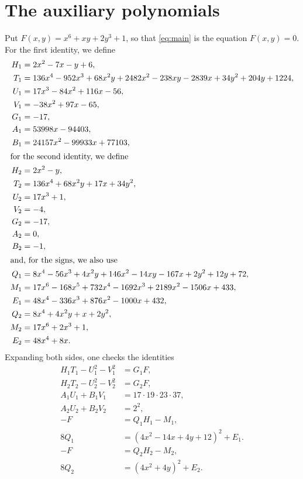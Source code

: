 \documentclass[11pt]{article}
\begin{document}
\section{The auxiliary polynomials}

Put $F(x,y)=x^{6}+xy+2y^{3}+1$, so that \eqref{eq:main} is the equation $F(x,y)=0$.
For the first identity, we define
\begin{align*}
H_{1}&=2x^{2}-7x-y+6,\\
T_{1}&=136x^{4}-952x^{3}+68x^{2}y+2482x^{2}-238xy-2839x+34y^{2}+204y+1224,\\
U_{1}&=17x^{3}-84x^{2}+116x-56,\\
V_{1}&=-38x^{2}+97x-65,\\
G_{1}&=-17,\\
A_{1}&=53998x-94403,\\
B_{1}&=24157x^{2}-99933x+77103,\\
\intertext{for the second identity, we define}
H_{2}&=2x^{2}-y,\\
T_{2}&=136x^{4}+68x^{2}y+17x+34y^{2},\\
U_{2}&=17x^{3}+1,\\
V_{2}&=-4,\\
G_{2}&=-17,\\
A_{2}&=0,\\
B_{2}&=-1,\\
\intertext{and, for the signs, we also use}
Q_{1}&=8x^{4}-56x^{3}+4x^{2}y+146x^{2}-14xy-167x+2y^{2}+12y+72,\\
M_{1}&=17x^{6}-168x^{5}+732x^{4}-1692x^{3}+2189x^{2}-1506x+433,\\
E_{1}&=48x^{4}-336x^{3}+876x^{2}-1000x+432,\\
Q_{2}&=8x^{4}+4x^{2}y+x+2y^{2},\\
M_{2}&=17x^{6}+2x^{3}+1,\\
E_{2}&=48x^{4}+8x.
\end{align*}
Expanding both sides, one checks the identities
\begin{align}
H_{1}T_{1}-U_{1}^2-V_{1}^2&=G_{1}F,\label{eq:norm1}\\
H_{2}T_{2}-U_{2}^2-V_{2}^2&=G_{2}F,\label{eq:norm2}\\
A_{1}U_{1}+B_{1}V_{1}&=17\cdot 19\cdot 23\cdot 37,\label{eq:bez1}\\
A_{2}U_{2}+B_{2}V_{2}&=2^{2},\label{eq:bez2}\\
-F&=Q_{1}H_{1}-M_{1},\label{eq:sign1}\\
8Q_{1}&=(4x^{2}-14x+4y+12)^2+E_{1}.\label{eq:sign1b}\\
-F&=Q_{2}H_{2}-M_{2},\label{eq:sign2}\\
8Q_{2}&=(4x^{2}+4y)^2+E_{2}.\label{eq:sign2b}
\end{align}
\end{document}
